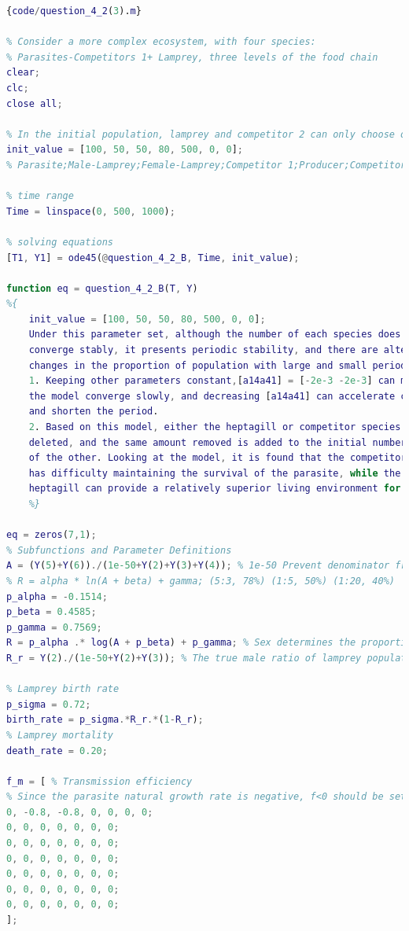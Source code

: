 \documentclass[12pt]{article}  %
\begin{document}
\linenumbers
\begin{lstlisting}[language=Matlab]{code/question_4_2(3).m}
	
% Consider a more complex ecosystem, with four species:
% Parasites-Competitors 1+ Lamprey, three levels of the food chain
clear;
clc;
close all;

% In the initial population, lamprey and competitor 2 can only choose one
init_value = [100, 50, 50, 80, 500, 0, 0]; 
% Parasite;Male-Lamprey;Female-Lamprey;Competitor 1;Producer;Competitor 2

% time range
Time = linspace(0, 500, 1000);

% solving equations
[T1, Y1] = ode45(@question_4_2_B, Time, init_value);

function eq = question_4_2_B(T, Y) 
%{
	init_value = [100, 50, 50, 80, 500, 0, 0];
	Under this parameter set, although the number of each species does not 
	converge stably, it presents periodic stability, and there are alternate 
	changes in the proportion of population with large and small periodic competitors.
	1. Keeping other parameters constant,[a14a41] = [-2e-3 -2e-3] can make 
	the model converge slowly, and decreasing [a14a41] can accelerate convergence 
	and shorten the period.
	2. Based on this model, either the heptagill or competitor species are 
	deleted, and the same amount removed is added to the initial number 
	of the other. Looking at the model, it is found that the competitor 
	has difficulty maintaining the survival of the parasite, while the 
	heptagill can provide a relatively superior living environment for the parasite.
	%}

eq = zeros(7,1);
% Subfunctions and Parameter Definitions
A = (Y(5)+Y(6))./(1e-50+Y(2)+Y(3)+Y(4)); % 1e-50 Prevent denominator from zero
% R = alpha * ln(A + beta) + gamma; (5:3, 78%) (1:5, 50%) (1:20, 40%)
p_alpha = -0.1514;
p_beta = 0.4585;
p_gamma = 0.7569;
R = p_alpha .* log(A + p_beta) + p_gamma; % Sex determines the proportion of males
R_r = Y(2)./(1e-50+Y(2)+Y(3)); % The true male ratio of lamprey populations at a given time

% Lamprey birth rate
p_sigma = 0.72;
birth_rate = p_sigma.*R_r.*(1-R_r);
% Lamprey mortality
death_rate = 0.20;

f_m = [ % Transmission efficiency
% Since the parasite natural growth rate is negative, f<0 should be set to help it survive.
0, -0.8, -0.8, 0, 0, 0, 0;
0, 0, 0, 0, 0, 0, 0;
0, 0, 0, 0, 0, 0, 0;
0, 0, 0, 0, 0, 0, 0;
0, 0, 0, 0, 0, 0, 0;
0, 0, 0, 0, 0, 0, 0;
0, 0, 0, 0, 0, 0, 0;
];


\end{lstlisting}
\end{document}

